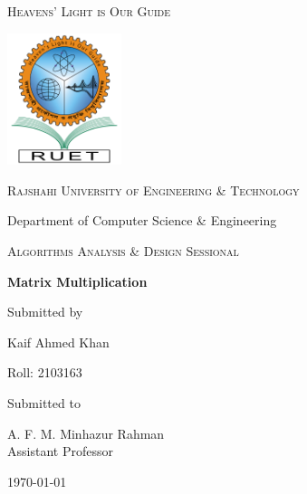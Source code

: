 \documentclass[12pt,a4paper]{article}
\newcommand{\univ}{Rajshahi University of Engineering \& Technology}
\newcommand{\thedept}{Department of Computer Science \& Engineering}
\newcommand{\thecourse}{Algorithms Analysis \& Design Sessional}
\newcommand{\thetitle}{Matrix Multiplication}
\newcommand{\theauthor}{Kaif Ahmed Khan}
\newcommand{\thesupervisor}{A. F. M. Minhazur Rahman}
\newcommand{\asp}{Assistant Professor}
\newcommand{\thedesignation}{\asp}
\begin{document}
\begin{titlepage}
\centering
{\scshape Heavens' Light is Our Guide\par}\vspace{.25cm}
\includegraphics[width=0.25\textwidth]{logo}\par\vspace{1cm}
{\scshape\LARGE \univ\par}
\vspace{.5cm}
{\Large \thedept\par}
\vspace{1cm}
{\scshape\Large \thecourse\par}
\vspace{1cm}
{\huge\bfseries \thetitle\par}
\vspace{1cm}
Submitted by\par
{\Large \theauthor\par}
{\Large Roll: 2103163\par}
\vfill
Submitted to\par
{\Large \thesupervisor\\\thedesignation\par}
\vfill
{\large \today\par}
\end{titlepage}
\tableofcontents
\newpage
\listoflistings
\listoffigures
\newpage
% 
% 

\end{document}
